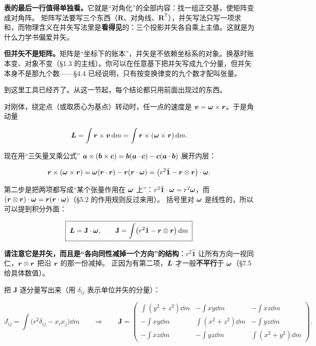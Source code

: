 \documentclass[11pt]{ctexart}
\newcommand{\ten}[1]{\mathbf{#1}}
\newcommand{\unitd}{\hat{\ten{1}}}
\let\orighdr\hdr
\renewcommand{\hdr}[2]{\par\needspace{5\baselineskip}\orighdr{#1}{#2}}
\let\origsubhdr\subhdr
\renewcommand{\subhdr}[1]{\par\needspace{3\baselineskip}\origsubhdr{#1}}
\begin{document}
\textbf{表的最后一行值得单独看。}它就是“对角化”的全部内容：找一组正交基，使矩阵变成对角阵。
矩阵写法要写三个东西（$\ten R$、对角线、$\ten R^{\mathsf T}$），并矢写法只写一项求和，而物理含义在并矢写法里是\textbf{看得见}的：三个投影并矢各自乘上主值。这就是为什么力学书偏爱并矢。

\textbf{但并矢不是矩阵。}矩阵是“坐标下的账本”，并矢是不依赖坐标系的对象。换基时账本变、对象不变（§1.3 的主线）。你可以在任意基下把并矢写成九个分量，但并矢本身不是那九个数——§4.4 已经说明，只有按变换律变的九个数才配叫张量。


到这里工具已经齐了。从这一节起，每个结论都只用前面出现过的东西。


对刚体，绕定点（或取质心为基点）转动时，任一点的速度是 $\boldsymbol{v}=\boldsymbol{\omega}\times\boldsymbol{r}$。于是角动量

\[
\boldsymbol{L}=\int\boldsymbol{r}\times\boldsymbol{v}\,\mathrm{d} m=\int\boldsymbol{r}\times(\boldsymbol{\omega}\times\boldsymbol{r})\,\mathrm{d} m .
\]

现在用“三矢量叉乘公式” $\boldsymbol{a}\times(\boldsymbol{b}\times\boldsymbol{c})=\boldsymbol{b}(\boldsymbol{a}\cdot\boldsymbol{c})-\boldsymbol{c}(\boldsymbol{a}\cdot\boldsymbol{b})$ 展开内层：

\[
\vect r\times(\vect\omega\times\vect r)=\vect\omega(\vect r\cdot\vect r)-\vect r(\vect r\cdot\vect\omega)
=\bigl(r^2\unitd-\vect r\otimes\vect r\bigr)\cdot\vect\omega .
\]

第二步是把两项都写成“某个张量作用在 $\boldsymbol{\omega}$ 上”：$r^2\unitd\cdot\vect\omega=r^2\vect\omega$，而 $(\boldsymbol{r}\otimes\boldsymbol{r})\cdot\boldsymbol{\omega}=\boldsymbol{r}(\boldsymbol{r}\cdot\boldsymbol{\omega})$（§5.2 的作用规则反过来用）。
括号里对 $\boldsymbol{\omega}$ 是线性的，所以可以提到积分外面：

\[
\boxed{\;\vect L=\ten J\cdot\vect\omega,\qquad
\ten J=\int\bigl(r^2\unitd-\vect r\otimes\vect r\bigr)\dd m\;}
\]

\textbf{请注意它是并矢，而且是“各向同性减掉一个方向”的结构}：$r^2\unitd$ 让所有方向一视同仁，$\boldsymbol{r}\otimes\boldsymbol{r}$ 把沿 $\boldsymbol{r}$ 的那一份减掉。
正因为有第二项，$\boldsymbol{L}$ 才一般\textbf{不平行}于 $\boldsymbol{\omega}$（§7.5 给具体数值）。


把 $\ten J$ 逐分量写出来（用 $\delta_{ij}$ 表示单位并矢的分量）：

\[
J_{ij}=\int\bigl(r^2\delta_{ij}-x_ix_j\bigr)\dd m
\qquad\Longrightarrow\qquad
\ten J=
\begin{pmatrix}
\int(y^2+z^2)\dd m & -\int xy\dd m & -\int xz\dd m\\[3pt]
-\int xy\dd m & \int(x^2+z^2)\dd m & -\int yz\dd m\\[3pt]
-\int xz\dd m & -\int yz\dd m & \int(x^2+y^2)\dd m
\end{pmatrix}.
\]
\end{document}

